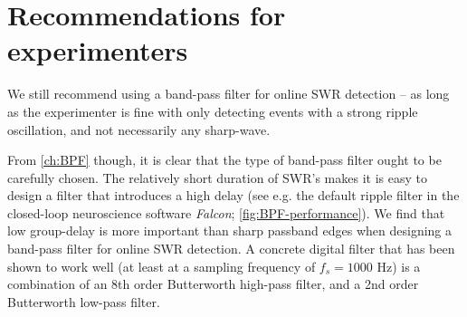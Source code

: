 \section{Recommendations for experimenters}

We still recommend using a band-pass filter for online SWR detection -- as long as the experimenter is fine with only detecting events with a strong ripple oscillation, and not necessarily any sharp-wave.

From \cref{ch:BPF} though, it is clear that the type of band-pass filter ought to be carefully chosen. The relatively short duration of SWR's makes it is easy to design a filter that introduces a high delay (see e.g. the default ripple filter in the closed-loop neuroscience software \emph{Falcon}; \cref{fig:BPF-performance}). We find that low group-delay is more important than sharp passband edges when designing a band-pass filter for online SWR detection. A concrete digital filter that has been shown to work well (at least at a sampling frequency of $f_s = 1000$ Hz) is a combination of an 8th order Butterworth high-pass filter, and a 2nd order Butterworth low-pass filter.
